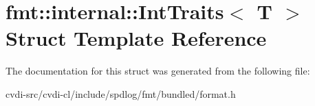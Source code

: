 \hypertarget{structfmt_1_1internal_1_1IntTraits}{}\section{fmt\+:\+:internal\+:\+:Int\+Traits$<$ T $>$ Struct Template Reference}
\label{structfmt_1_1internal_1_1IntTraits}


The documentation for this struct was generated from the following file\+:\begin{DoxyCompactItemize}
\item 
cvdi-\/src/cvdi-\/cl/include/spdlog/fmt/bundled/format.\+h\end{DoxyCompactItemize}
